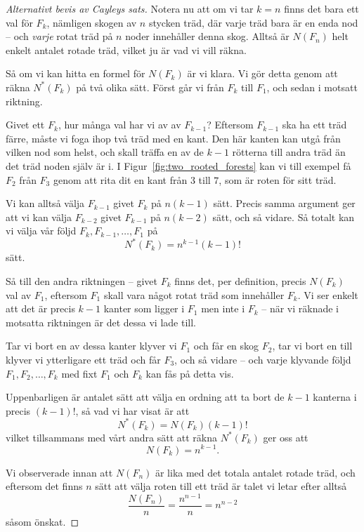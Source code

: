 \documentclass[nobib]{tufte-handout}
\begin{document}
\begin{proof}[Alternativt bevis av Cayleys sats]
    Notera nu att om vi tar $k = n$ finns det bara ett val för $F_k$, nämligen skogen av $n$ stycken träd, där varje träd bara är en enda nod -- och \emph{varje} rotat träd på $n$ noder innehåller denna skog. Alltså är $N(F_n)$ helt enkelt antalet rotade träd, vilket ju är vad vi vill räkna.

    Så om vi kan hitta en formel för $N(F_k)$ är vi klara. Vi gör detta genom att räkna $N^*(F_k)$ på två olika sätt. Först går vi från $F_k$ till $F_1$, och sedan i motsatt riktning.

    Givet ett $F_k$, hur många val har vi av av $F_{k-1}$? Eftersom $F_{k-1}$ ska ha ett träd färre, måste vi foga ihop två träd med en kant. Den här kanten kan utgå från vilken nod som helst, och skall träffa en av de $k-1$ rötterna till andra träd än det träd noden själv är i. I Figur~\ref{fig:two_rooted_forests} kan vi till exempel få $F_2$ från $F_3$ genom att rita dit en kant från $3$ till $7$, som är roten för sitt träd.

    Vi kan alltså välja $F_{k-1}$ givet $F_k$ på $n(k-1)$ sätt. Precis samma argument ger att vi kan välja $F_{k-2}$ givet $F_{k-1}$ på $n(k-2)$ sätt, och så vidare. Så totalt kan vi välja vår följd $F_k, F_{k-1}, \ldots, F_1$ på
    $$N^*(F_k) = n^{k-1}(k-1)!$$
    sätt.

    Så till den andra riktningen -- givet $F_k$ finns det, per definition, precis $N(F_k)$ val av $F_1$, eftersom $F_1$ skall vara något rotat träd som innehåller $F_k$. Vi ser enkelt att det är precis $k-1$ kanter som ligger i $F_1$ men inte i $F_k$ -- när vi räknade i motsatta riktningen är det dessa vi lade till.

    Tar vi bort en av dessa kanter klyver vi $F_1$ och får en skog $F_2$, tar vi bort en till klyver vi ytterligare ett träd och får $F_3$, och så vidare -- och varje klyvande följd $F_1, F_2, \ldots, F_k$ med fixt $F_1$ och $F_k$ kan fås på detta vis.

    Uppenbarligen är antalet sätt att välja en ordning att ta bort de $k-1$ kanterna i precis $(k-1)!$, så vad vi har visat är att
    $$N^*(F_k) = N(F_k)(k-1)!$$
    vilket tillsammans med vårt andra sätt att räkna $N^*(F_k)$ ger oss att
    $$N(F_k) = n^{k-1}.$$

    Vi observerade innan att $N(F_n)$ är lika med det totala antalet rotade träd, och eftersom det finns $n$ sätt att välja roten till ett träd är talet vi letar efter alltså
    $$\frac{N(F_n)}{n} = \frac{n^{n-1}}{n} = n^{n-2}$$
    såsom önskat.
\end{proof}
\end{document}
